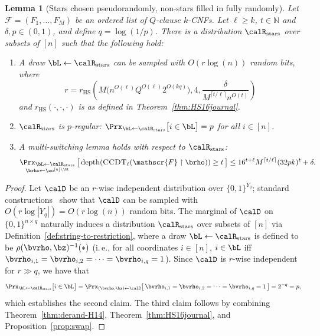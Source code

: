\documentclass[11pt]{article}
\numberwithin{equation}{section}
\newtheorem{lemma}[theorem]{Lemma}
\theoremstyle{definition}
\theoremstyle{plain}
\newcommand{\N}{\mathbb N}
\newcommand{\ie}{i.\,e.}
\theoremstyle{plain}
\newcommand{\uhr}{\upharpoonright}
\newcommand{\CCDT}{\textsc{CCDT}}
\newcommand{\depth}{\mathrm{depth}}
\newcommand{\stars}{\mathrm{stars}}
\renewcommand{\N}{\mathds{N}}
\begin{document}
\begin{lemma}[Stars chosen pseudorandomly, non-stars filled in fully randomly] 
\label{lem:PSL} 
Let $\mathscr{F} = (F_1,\ldots,F_M)$ be an ordered list of $Q$-clause $k$-CNFs. Let $\ell \geq k$, $t \in \N$ and $\delta,p \in (0,1)$, and define $q = \log(1/p)$.  There is a distribution $\calR_\stars$ over subsets of $[n]$ such that the following hold: 
\begin{enumerate} 
\item A draw $\bL\leftarrow\calR_\stars$ can be sampled with $O(r\log(n))$ random bits, where 
\[ r = r_{\mathrm{HS}}\left(M\big(n^{O(\ell)}Q^{O(\ell)}  2^{O(kq)}\big), 4, \frac{\delta}{M^{\lceil t/\ell\rceil} n^{O(t)}}\right)\]
and $r_{\mathrm{HS}}(\cdot,\cdot,\cdot)$ is as defined in Theorem~\ref{thm:HS16journal}.  
\item $\calR_\stars$ is $p$-regular:  $\Prx_{\bL\leftarrow\calR_\stars}\big[i\in \bL\big] = p$ for all $i\in [n]$. 
\item A multi-switching lemma holds with respect to $\calR_\stars$: 
 \begin{equation} \mathop{\Prx_{\bL\leftarrow\calR_\stars}}_{\brho\leftarrow\zo^{[n]\setminus \bL}}\big[\,\depth(\CCDT_{\ell}(\mathscr{F}\uhr\brho)) \ge t\,\big] \le 16^{t+\ell}M^{\lceil t/\ell\rceil} (32pk)^t + \delta. \label{eq:failure}
 \end{equation} 
\end{enumerate} 
\end{lemma} 

\begin{proof} 
Let $\calD$ be an $r$-wise independent distribution over $\{0,1\}^{Y_q}$; standard constructions~\cite{ABI86} show that $\calD$ can be sampled with $O(r \log |Y_q|) = O(r\log(n))$ random bits. The marginal of $\calD$ on $\{0,1\}^{n\times q}$ naturally induces a distribution $\calR_\stars$ over subsets of $[n]$ via Definition~\ref{def:string-to-restriction}, where a draw $\bL \leftarrow \calR_\stars$ is defined to be $\rho(\bvrho,\bz)^{-1}(\ast)$ (\ie, for all coordinates $i\in [n]$, $i \in \bL$ iff $\bvrho_{i,1} = \bvrho_{i,2} = \cdots =\bvrho_{i,q} = 1$).  Since $\calD$ is $r$-wise independent for $r \gg q$, we have that 
\[ \Prx_{\bL\leftarrow\calR_\stars}\big[i\in \bL\big]  = \Prx_{(\bvrho,\bz)\leftarrow \calD}\big[ \,\bvrho_{i,1} = \bvrho_{i,2} = \cdots =\bvrho_{i,q} = 1\,\big] =  2^{-q} = p, \] 
which establishes the second claim. The third claim follows by combining Theorem~\ref{thm:derand-H14}, Theorem~\ref{thm:HS16journal}, and Proposition~\ref{prop:swap}. 
\end{proof} 
\end{document}
